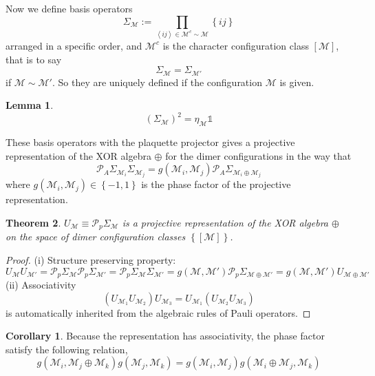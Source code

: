 \documentclass[12font]{article}
\newtheorem{theorem}{Theorem}[section]
\theoremstyle{definition}
\newtheorem{lemma}[theorem]{Lemma}
\newtheorem{corollary}{Corollary}[theorem]
\numberwithin{equation}{section}
\newcommand{\anglelr}[1]{\left\langle #1 \right\rangle}
\newcommand{\lr}[1]{\left(  #1  \right)}
\newcommand{\lrg}[1]{\left\{  #1  \right\}}
\begin{document}
Now we define basis operators
\[
\Sigma_\mathcal{M} := \prod_{\anglelr{ij}\in\mathcal{M}^{c}\sim\mathcal{M}}\lrg{ij}
\]
arranged in a specific order, and $\mathcal{M}^c$ is the character configuration class $[\mathcal{M}]$, that is to say
\[
\Sigma_{\mathcal{M}} = \Sigma_{\mathcal{M}'}
\]
if $\mathcal{M}\sim\mathcal{M}'$. So they are uniquely defined if the configuration $\mathcal{M}$ is given. 
\begin{lemma}
  \[
  \lr{\Sigma_\mathcal{M}}^2 = \eta_{\mathcal{M}} \mathds{1}
  \]
\end{lemma}
These basis operators with the plaquette projector gives a projective representation of the XOR algebra $\oplus$ for the dimer configurations in the way that
\begin{equation}\label{XORrepresentation.e}
  \mathcal{P}_A\Sigma_{\mathcal{M}_i}\Sigma_{\mathcal{M}_j} = g(\mathcal{M}_i,\mathcal{M}_j)\mathcal{P}_A \Sigma_{\mathcal{M}_i\oplus\mathcal{M}_j}
\end{equation}
where $g(\mathcal{M}_i,\mathcal{M}_j)\in\lrg{-1,1}$ is the phase factor of the projective representation. 

\begin{theorem}\label{thm.spin-representation}
  $U_\mathcal{M} \equiv \mathcal{P}_p\Sigma_{\mathcal{M}}$ is a projective representation of the XOR algebra $\oplus$ on the space of dimer configuration classes $\lrg{[\mathcal{M}]}$.
\end{theorem}
\begin{proof}
  (i) Structure preserving property: 
  \[
  U_\mathcal{M}U_{\mathcal{M}'} = \mathcal{P}_p\Sigma_{\mathcal{M}}\mathcal{P}_p\Sigma_{\mathcal{M}'} = \mathcal{P}_p\Sigma_{\mathcal{M}}\Sigma_{\mathcal{M}'} = g(\mathcal{M},\mathcal{M}')\mathcal{P}_p\Sigma_{\mathcal{M}\oplus\mathcal{M}'} = g(\mathcal{M},\mathcal{M}')U_{\mathcal{M}\oplus\mathcal{M}'}
  \]
  (ii) Associativity 
  \[(U_{\mathcal{M}_1}U_{\mathcal{M}_2})U_{\mathcal{M}_3} = U_{\mathcal{M}_1}(U_{\mathcal{M}_2}U_{\mathcal{M}_3})\]
  is automatically inherited from the algebraic rules of Pauli operators.
\end{proof}
\begin{corollary}
  Because the representation has associativity, the phase factor satisfy the following relation,
\begin{equation}\label{g-association.e}
g(\mathcal{M}_i,\mathcal{M}_j\oplus\mathcal{M}_k)g(\mathcal{M}_j,\mathcal{M}_k) = 
g(\mathcal{M}_i,\mathcal{M}_j)g(\mathcal{M}_i\oplus\mathcal{M}_j,\mathcal{M}_k)
\end{equation}
\end{corollary}
\end{document}
